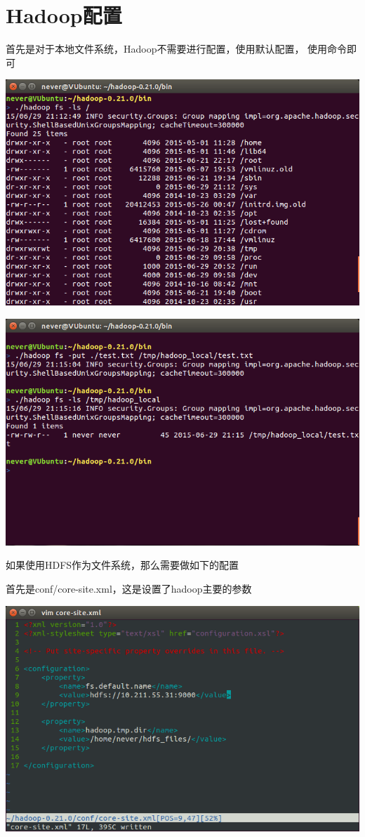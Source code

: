 \section{Hadoop配置}

首先是对于本地文件系统，Hadoop不需要进行配置，使用默认配置，
使用命令即可

\includegraphics[width=\textwidth]{image/env/cr7.png}

\includegraphics[width=\textwidth]{image/env/cr8.png}

如果使用HDFS作为文件系统，那么需要做如下的配置

首先是conf/core-site.xml，这是设置了hadoop主要的参数

\includegraphics[width=\textwidth]{image/env/cr9.png}

